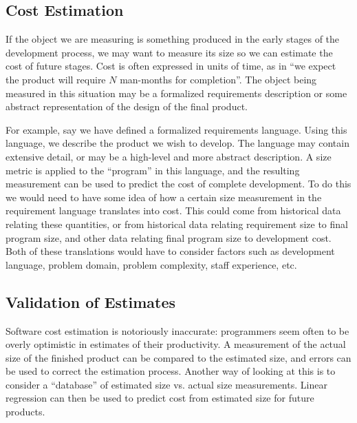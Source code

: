\subsection{Cost Estimation}

If the object we are measuring is something
produced in the early stages of the development process, we may want
to measure its size so we can estimate the cost of future stages.
Cost is often expressed in units of time, as in ``we expect the
product will require $N$ man-months for completion''.  The object being
measured in this situation may be a formalized requirements description 
or some abstract representation of the design of the final product.

For example, say we have defined a formalized requirements language.
Using this language, we describe the product we wish to develop.  The
language may contain extensive detail, or may be a high-level and more 
abstract description.  A size metric is applied to the ``program'' in
this language, and the resulting measurement can be used to predict
the cost of complete development.  To do this we would need to have
some idea of how a certain size measurement in the requirement
language translates into cost.  This could come from historical data
relating these quantities, or from historical data relating
requirement size to final program size, and other data relating final
program size to development cost.  Both of these translations would
have to consider factors such as development language, problem domain, 
problem complexity, staff experience, etc.

\subsection{Validation of Estimates}
Software cost estimation is notoriously inaccurate: programmers seem
often to be overly optimistic in estimates of their
productivity\cite{Putnam,Boehm}.  A measurement of the actual size of the finished
product can be compared to the estimated size, and errors can be used
to correct the estimation process.  Another way of looking at this is
to consider a ``database'' of estimated size vs. actual size
measurements.  Linear regression can then be used to predict cost from
estimated size for future products.


